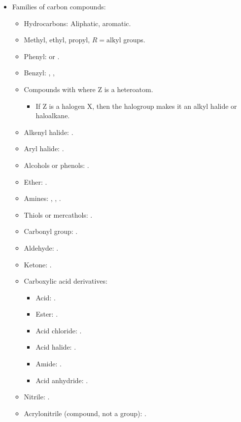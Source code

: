 \documentclass[../notes.tex]{subfiles}
\begin{document}
\begin{itemize}
    \item Families of carbon compounds:
    \begin{itemize}
        \item Hydrocarbons: Aliphatic, aromatic.
        \item Methyl, ethyl, propyl, $R=\text{alkyl}$ groups.
        \item Phenyl:  or \ce{$\phi${-}}.
        \item Benzyl: , , 
        \item Compounds with  where Z is a heteroatom.
        \begin{itemize}
            \item If Z is a halogen X, then the halogroup makes it an alkyl halide or haloalkane.
        \end{itemize}
        \item Alkenyl halide: .
        \item Aryl halide: .
        \item Alcohols or phenols: .
        \item Ether: .
        \item Amines: , , .
        \item Thiols or mercathols: .
        \item Carbonyl group: .
        \item Aldehyde: .
        \item Ketone: .
        \item Carboxylic acid derivatives:
        \begin{itemize}
            \item Acid: .
            \item Ester: .
            \item Acid chloride: .
            \item Acid halide: .
            \item Amide: .
            \item Acid anhydride: .
        \end{itemize}
        \item Nitrile: .
        \item Acrylonitrile (compound, not a group): .
    \end{itemize}
\end{itemize}
\end{document}
